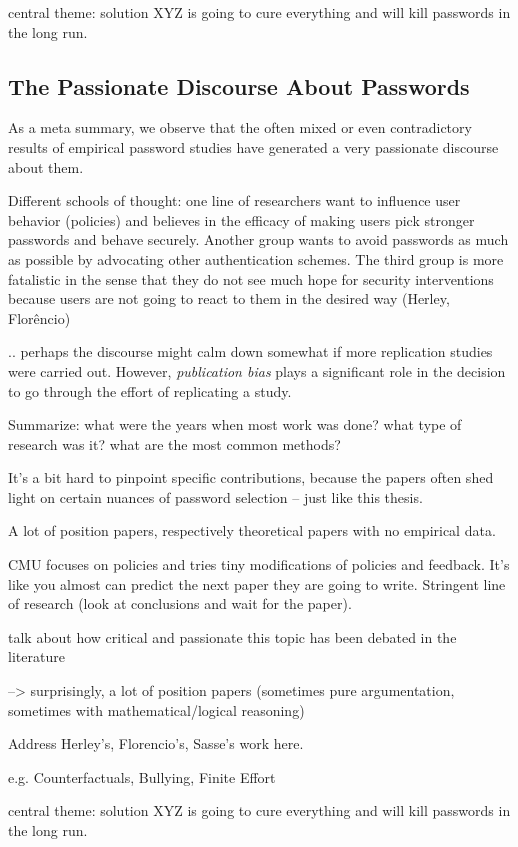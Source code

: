 central theme: solution XYZ is going to cure everything and will kill passwords in the long run. \subsection*{The Passionate Discourse About Passwords}\label{sec:rw:passionate_discourse}
As a meta summary, we observe that the often mixed or even contradictory results of empirical password studies have generated a very passionate discourse about them. 

Different schools of thought: one line of researchers want to influence user behavior (policies) and believes in the efficacy of making users pick stronger passwords and behave securely. Another group wants to avoid passwords as much as possible by advocating other authentication schemes. The third group is more fatalistic in the sense that they do not see much hope for security interventions because users are not going to react to them in the desired way (Herley, Florêncio)

.. perhaps the discourse might calm down somewhat if more replication studies were carried out. However, \textit{publication bias} plays a significant role in the decision to go through the effort of replicating a study. 


Summarize: what were the years when most work was done? what type of research was it? what are the most common methods?

It's a bit hard to pinpoint specific contributions, because the papers often shed light on certain nuances of password selection -- just like this thesis.

A lot of position papers, respectively theoretical papers with no empirical data.

CMU focuses on policies and tries tiny modifications of policies and feedback. It's like you almost can predict the next paper they are going to write. Stringent line of research (look at conclusions and wait for the paper).


talk about how critical and passionate this topic has been debated in the literature

--> surprisingly, a lot of position papers (sometimes pure argumentation, sometimes with mathematical/logical reasoning) 

Address Herley's, Florencio's, Sasse's work here. 

e.g. Counterfactuals, Bullying, Finite Effort 


central theme: solution XYZ is going to cure everything and will kill passwords in the long run. 